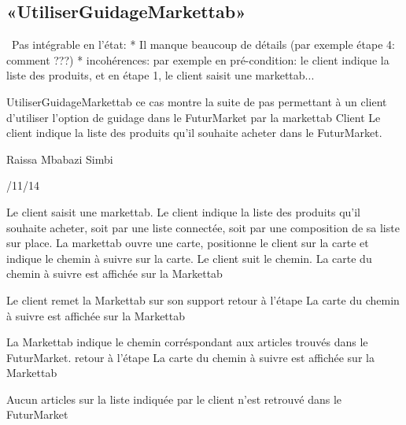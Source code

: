 \subsection{«UtiliserGuidageMarkettab»}
\TODO\ Pas intégrable en l'état:
* Il manque beaucoup de détails (par exemple étape 4: comment ???) 
* incohérences: par exemple en pré-condition: le client indique la liste des produits, et en étape 1, le client saisit une markettab...

\startCU
\nom UtiliserGuidageMarkettab
\but  ce cas montre la suite de pas permettant à un client d'utiliser l'option de guidage dans le FuturMarket par la markettab
\acteur Client
\precondition Le client indique la liste des produits qu'il souhaite acheter dans le FuturMarket.

\auteur Raissa Mbabazi Simbi
\date 7/11/14

\nominal %
\startnominal
{} Le client saisit une markettab. 
\etape Le client indique la liste des produits qu'il souhaite acheter, soit par une liste connectée, soit par une composition de sa liste sur place.
\etape[UGM:SE1]  La markettab ouvre une carte, positionne le client sur la carte et indique le chemin à suivre sur la carte.
 Le client suit le chemin.
\stopnominal
\postcondition La carte du chemin à suivre est affichée sur la Markettab

\alternatifs
{}
  \etape Le client remet la Markettab sur son support
  \etape retour à l'étape 
\stopcondition
\postcondition La carte du chemin à suivre est affichée sur la Markettab
\stopalternatif

\startalternatif[UGM:SE1]
   \etape  La Markettab indique le chemin corréspondant aux articles trouvés dans le FuturMarket.
  \etape retour à l'étape 
\stopcondition
\postcondition La carte du chemin à suivre est affichée sur la Markettab
\stopalternatif


\exception
Aucun articles sur la liste indiquée par le client n'est retrouvé dans le FuturMarket
\stopCU
